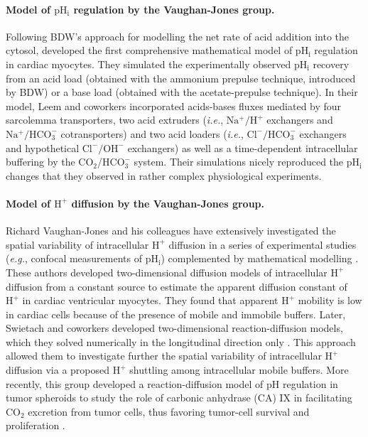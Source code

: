 \documentclass[fleqn,10pt]{physiome}
\begin{document}
\paragraph{Model of $\mathrm{pH_i}$ regulation by the Vaughan-Jones group.} Following BDW's approach for modelling the net rate of acid addition into the cytosol, \cite{leem1999characterization} developed the first comprehensive mathematical model of $\mathrm{pH_i}$  regulation in cardiac myocytes. They simulated the experimentally observed $\mathrm{pH_i}$  recovery from an acid load (obtained with the ammonium prepulse technique, introduced by BDW) or a base load (obtained with the acetate-prepulse technique). In their model, Leem and coworkers incorporated acids-bases fluxes mediated by four sarcolemma transporters, two acid extruders (\emph{i.e.}, $\mathrm{Na^+/H^+}$ exchangers and $\mathrm{Na^+/HCO_3^-}$ cotransporters) and two acid loaders (\emph{i.e.}, $\mathrm{Cl^-/HCO_3^-}$ exchangers and hypothetical $\mathrm{Cl^-/OH^-}$ exchangers) as well as a time-dependent intracellular buffering by the $\mathrm{CO_2}$/$\mathrm{HCO_3^-}$ system. Their simulations nicely reproduced the $\mathrm{pH_i}$ changes that they observed in rather complex physiological experiments.\\

\paragraph{Model of $\mathrm{H^+}$ diffusion by the Vaughan-Jones group.} Richard Vaughan-Jones and his colleagues have extensively investigated the spatial variability of intracellular $\mathrm{H^+}$ diffusion in a series of experimental studies (\emph{e.g.}, confocal measurements of $\mathrm{pH_i}$) complemented by mathematical modelling \citep{vaughan2002intrinsic,zaniboni2003intracellular,swietach2003modelling}. These authors developed two-dimensional diffusion models of intracellular $\mathrm{H^+}$ diffusion from a constant source to estimate the apparent diffusion constant of $\mathrm{H^+}$ in cardiac ventricular myocytes. They found that apparent $\mathrm{H^+}$ mobility is low in cardiac cells because of the presence of mobile and immobile buffers. Later, Swietach and coworkers developed two-dimensional reaction-diffusion models, which they solved numerically in the longitudinal direction only \citep{swietach2003modelling,swietach2005experimental}. This approach allowed them to investigate further the spatial variability of intracellular $\mathrm{H^+}$ diffusion via a proposed $\mathrm{H^+}$ shuttling among intracellular mobile buffers. More recently, this group developed a reaction-diffusion model of $\mathrm{pH}$ regulation in tumor spheroids to study the role of carbonic anhydrase (CA) IX in facilitating $\mathrm{CO_2}$ excretion from tumor cells, thus favoring tumor-cell survival and proliferation \citep{swietach2008tumor,swietach2009role}.\\
\end{document}
